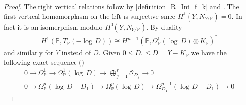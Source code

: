 \documentclass[12pt, english]{article}
\begin{document}
\begin{proof}
	The right vertical relations follow by \ref{definition_R_Int_f_k} and \cite[Cor.6.0.8]{Bat93}.  The first vertical homomorphism on the left is surjective since $H^1(Y,N_{Y/\mathbb{P}}) = 0$. In fact it is an isomorphism modulo $H^0(Y,N_{Y/\mathbb{P}})$. By duality
	\begin{align*}
		& H^1(\mathbb{P}, T_{\mathbb{P}}(- \log \, D)) \cong H^{n-1}(\mathbb{P}, \Omega_{\mathbb{P}}^1(\log \, D) \otimes K_{\mathbb{P}})^* 
	\end{align*}
	and similarly for $Y$ instead of $D$. Given $0 \leq D_1 \leq D = Y - K_{\mathbb{P}}$ we have the following exact sequence (\cite[2.3 Properties]{EsVi92})
	\begin{align*}
		& 0 \rightarrow \Omega_{\mathbb{P}}^1 \rightarrow \Omega_{\mathbb{P}}^1(\log \, D) \rightarrow \bigoplus\limits_{j=1}^r \mathcal{O}_{D_j} \rightarrow 0 \\
		& 0 \rightarrow \Omega_{\mathbb{P}}^p(\log \, D-D_1) \rightarrow \Omega_{\mathbb{P}}^p(\log \, D) \rightarrow \Omega_{D_1}^{p-1}(\log \, D-D_1) \rightarrow 0
	\end{align*}
	
	

	

\end{proof}
\end{document}

